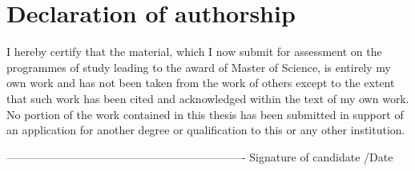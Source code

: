 
\chapter*{Declaration of authorship}
I hereby certify that the material, which I now submit for assessment on the programmes of study leading to the award of Master of Science, is entirely my own work and has not been taken from the work of others except to the extent that such work has been cited and acknowledged within the text of my own work. No portion of the work contained in this thesis has been submitted in support of an application for another degree or qualification to this or any other institution.

\bigskip 
\bigskip 
\bigskip 
----------------------------------------------------------------
Signature of candidate								/Date
\bigskip 
\medskip
\\

